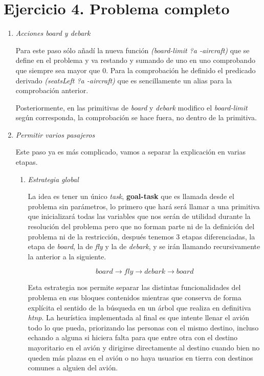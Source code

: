 \documentclass{article}
\begin{document}
\section*{Ejercicio 4. Problema completo}	

\begin{enumerate}

	\item \emph{Acciones board y debark}
	
	Para este paso sólo añadí la nueva función \emph{(board-limit ?a -aircraft)} que se define en el problema y va restando y sumando de uno en uno comprobando que siempre sea mayor que 0. Para la comprobación he definido el predicado derivado \emph{(seatsLeft ?a -aircraft)} que es sencillamente un alias para la comprobación anterior.
	
	Posteriormente, en las primitivas de \emph{board} y \emph{debark} modifico el \emph{board-limit} según corresponda, la comprobación se hace fuera, no dentro de la primitiva.
	
	\item \emph{Permitir varios pasajeros}
	
	Este paso ya es más complicado, vamos a separar la explicación en varias etapas.
	
	\begin{enumerate}
		
		\item \emph{Estrategia global}
		
		La idea es tener un único \emph{task}, \textbf{goal-task} que es llamada desde el problema sin parámetros, lo primero que hará será llamar a una primitiva que inicializará todas las variables que nos serán de utilidad durante la resolución del problema pero que no forman parte ni de la definición del problema ni de la restricción, después tenemos 3 etapas diferenciadas, la etapa de \emph{board}, la de \emph{fly} y la de \emph{debark}, y se irán llamando recursivamente la anterior a la siguiente.
		
		\[ board \rightarrow fly \rightarrow debark \rightarrow board \]
		
		Esta estrategia nos permite separar las distintas funcionalidades del problema en sus bloques contenidos mientras que conserva de forma explícita el sentido de la búsqueda en un árbol que realiza en definitiva \emph{htnp}. La heurística implementada al final es que intente llenar el avión todo lo que pueda, priorizando las personas con el mismo destino, incluso echando a alguna si hiciera falta para que entre otra con el destino mayoritario en el avión y dirigirse directamente al destino cuando bien no queden más plazas en el avión o no haya usuarios en tierra con destinos comunes a alguien del avión.
		

\end{enumerate}
\end{enumerate}
\end{document}
